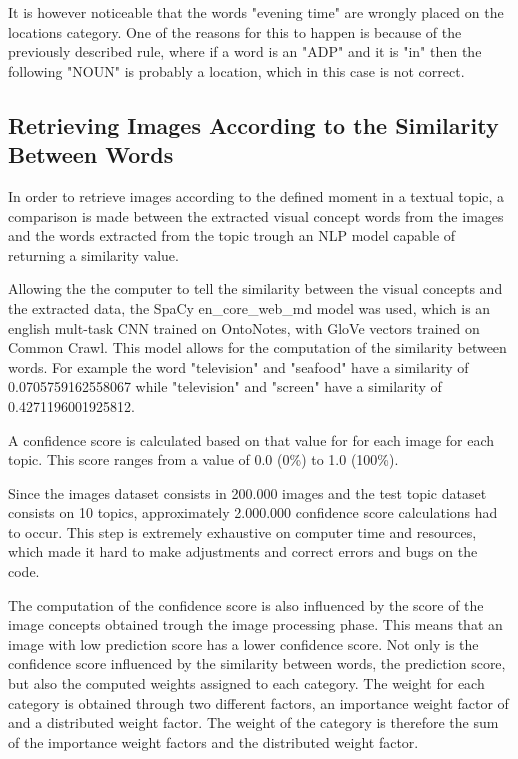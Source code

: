     It is however noticeable that the words "evening time" are wrongly placed on the locations category. One of the reasons for this to happen is because of the previously described rule, where if a word is an "ADP" and it is "in" then the following "NOUN" is probably a location, which in this case is not correct.

    \subsection{Retrieving Images According to the Similarity Between Words}

    In order to retrieve images according to the defined moment in a textual topic, a comparison is made between the extracted visual concept words from the images and the words extracted from the topic trough an NLP model capable of returning a similarity value.

    Allowing the the computer to  tell the similarity between the visual concepts and the extracted data, the SpaCy en\_core\_web\_md model was used, which is an english mult-task CNN trained on OntoNotes, with GloVe vectors trained on Common Crawl. This model allows for the computation of the similarity between words. For example the word "television" and "seafood" have a similarity of 0.0705759162558067 while "television" and "screen" have a similarity of 0.4271196001925812.
    
    A confidence score is calculated based on that value for for each image for each topic. This score ranges from a value of 0.0 (0\%) to 1.0 (100\%).

    Since the images dataset consists in 200.000 images and the test topic dataset consists on 10 topics, approximately 2.000.000 confidence score calculations had to occur. This step is extremely exhaustive on computer time and resources, which made it  hard to make adjustments and correct errors and bugs on the code.
    
    The computation of the confidence score is also influenced by the score of the image concepts obtained trough the image processing phase. This means that an image with low prediction score has a lower confidence score. Not only is the confidence score influenced by the similarity between words, the prediction score, but also the computed weights assigned to each category. The weight for each category is obtained through two different factors, an importance weight factor of and a distributed weight factor. The weight of the category is therefore the sum of the importance weight factors and the distributed weight factor.


